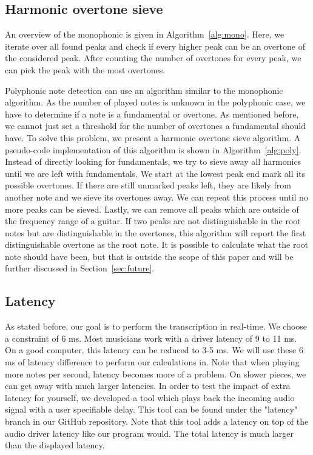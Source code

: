 \documentclass[10pt,twocolumn]{article}
\begin{document}
\subsection{Harmonic overtone sieve}  \label{sub:impnoteset}
An overview of the monophonic is given in Algorithm~\ref{alg:mono}. Here, we iterate over all found peaks and check if every higher peak can be an overtone of the considered peak. After counting the number of overtones for every peak, we can pick the peak with the most overtones.



Polyphonic note detection can use an algorithm similar to the monophonic algorithm. As the number of played notes is unknown in the polyphonic case, we have to determine if a note is a fundamental or overtone. As mentioned before, we cannot just set a threshold for the number of overtones a fundamental should have. To solve this problem, we present a harmonic overtone sieve algorithm. A pseudo-code implementation of this algorithm is shown in Algorithm~\ref{alg:poly}. Instead of directly looking for fundamentals, we try to sieve away all harmonics until we are left with fundamentals. We start at the lowest peak end mark all its possible overtones. If there are still unmarked peaks left, they are likely from another note and we sieve its overtones away. We can repeat this process until no more peaks can be sieved. Lastly, we can remove all peaks which are outside of the frequency range of a guitar. If two peaks are not distinguishable in the root notes but are distinguishable in the overtones, this algorithm will report the first distinguishable overtone as the root note. It is possible to calculate what the root note should have been, but that is outside the scope of this paper and will be further discussed in Section~\ref{sec:future}.

\subsection{Latency}  \label{sec:lat}
As stated before, our goal is to perform the transcription in real-time. We choose a constraint of 6 ms. Most musicians work with a driver latency of 9 to 11 ms. On a good computer, this latency can be reduced to 3-5 ms. We will use these 6 ms of latency difference to perform our calculations in. Note that when playing more notes per second, latency becomes more of a problem. On slower pieces, we can get away with much larger latencies. In order to test the impact of extra latency for yourself, we developed a tool which plays back the incoming audio signal with a user specifiable delay. This tool can be found under the "latency" branch in our GitHub repository. Note that this tool adds a latency on top of the audio driver latency like our program would. The total latency is much larger than the displayed latency.
\end{document}
